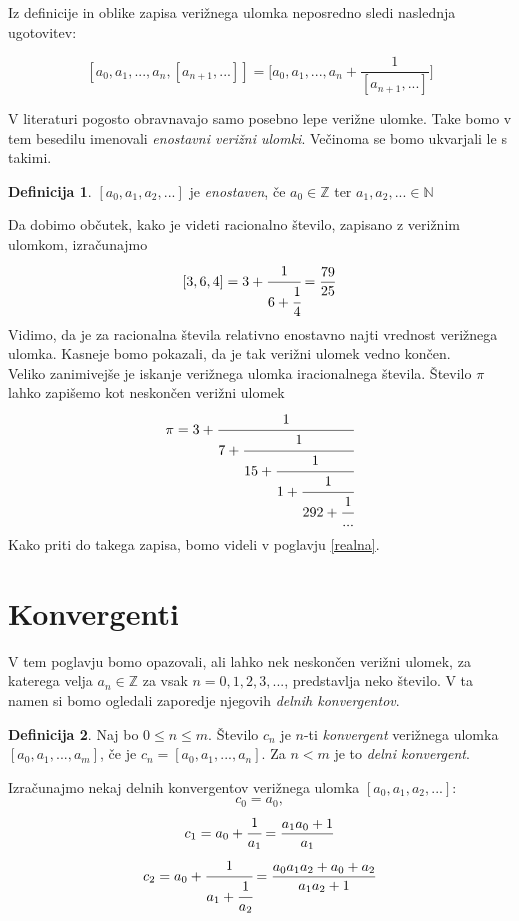 \documentclass[a4paper,12pt]{article}
\newcommand{\N}{\mathbb{N}}
\newcommand{\Z}{\mathbb{Z}}
\theoremstyle{definition}
\newtheorem{df}{Definicija}[section]
\theoremstyle{proposition}
\theoremstyle{theorem}
\theoremstyle{lemma}
\begin{document}
Iz definicije in oblike zapisa verižnega ulomka neposredno sledi naslednja ugotovitev:

\begin{equation}
\label{ocitno}
[a_0, a_1, ..., a_n, [a_{n+1}, ...]]=\Bigg[ a_0, a_1, ..., a_n+\frac{1}{[a_{n+1}, ...]}\Bigg]
\end{equation}

V literaturi pogosto obravnavajo samo posebno lepe verižne ulomke. Take bomo v tem besedilu imenovali \textit{enostavni verižni ulomki}. Večinoma se bomo ukvarjali le s takimi.

\begin{df}
	$[a_0, a_1, a_2, ...]$ je \textit{enostaven}, če $a_0 \in \Z$ ter $a_1, a_2, ... \in \N$
\end{df}

Da dobimo občutek, kako je videti racionalno število, zapisano z verižnim ulomkom, izračunajmo \[ [3,6,4] = 3 + \cfrac{1}{6+\cfrac{1}{4}} = \frac{79}{25}\]
Vidimo, da je za racionalna števila relativno enostavno najti vrednost verižnega ulomka. Kasneje bomo pokazali, da je tak verižni ulomek vedno končen.\\ Veliko zanimivejše je iskanje verižnega ulomka iracionalnega števila. Število $\pi$ lahko zapišemo kot neskončen verižni ulomek \[ \pi = 3 + \cfrac{1}{7 + \cfrac{1}{15 + \cfrac{1}{1 + \cfrac{1}{292 + \cfrac{1}{...}}}}} \]
Kako priti do takega zapisa, bomo videli v poglavju \ref{realna}.

\section{Konvergenti} \label{konv}

V tem poglavju bomo opazovali, ali lahko nek neskončen verižni ulomek, za katerega velja $a_n \in \Z$ za vsak $n = 0, 1, 2, 3, ...$, predstavlja neko število. V ta namen si bomo ogledali zaporedje njegovih \textit{delnih konvergentov}.

\begin{df}
Naj bo $0 \leq n \leq m$. Število $c_n$ je $n$-ti \textit{konvergent} 		verižnega ulomka $[a_0, a_1, ..., a_m]$, če je $c_n = [a_0, a_1, ..., a_n]$. Za $n < m$ je to \textit{delni konvergent}.
\end{df}

Izračunajmo nekaj delnih konvergentov verižnega ulomka $[a_0, a_1, a_2, ...]$: 
\begin{equation*}
c_0=a_0,
\end{equation*}
\begin{equation}
\label{prvikonvergenti}
c_1=a_0+\cfrac{1}{a_1}=\frac{a_1 a_0 + 1}{a_1}
\end{equation}
\begin{equation*}
c_2 = a_0 + \cfrac{1}{a_1 + \cfrac{1}{a_2}} =\frac{a_0 a_1 a_2 + a_0 + a_2}{a_1 a_2 + 1}
\end{equation*}
\end{document}
